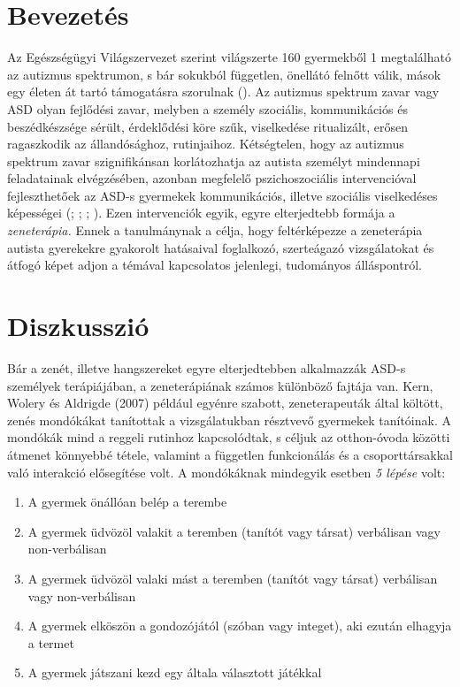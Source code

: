\section*{Bevezetés}

Az Egészségügyi Világszervezet szerint világ\-szerte 160 gyermekből 1 megtalálható az autizmus spektrumon, s bár sokukból független, önellátó felnőtt válik, mások egy életen át tartó támogatásra szorulnak (\cite{WHO}). Az autizmus spektrum zavar vagy ASD olyan fejlődési zavar, melyben a személy szociális, kommunikációs és beszédkészsége sérült, érdeklődési köre szűk, viselkedése ritualizált, erősen ragaszkodik az állandósághoz, rutinjaihoz. Kétségtelen, hogy az autizmus spektrum zavar szignifikánsan korlátozhatja az autista személyt mindennapi feladatainak elvégzésé\-ben, azonban megfelelő pszichoszociális intervencióval fejleszthetőek az ASD-s gyermekek kommunikációs, illetve szociális viselkedéses képességei (\textcite{boso_emanuele_minazzi_abbamonte_politi_2007}; \textcite{finnigan_starr_2010}; \textcite{kern_wolery_aldridge_2006}; \textcite{kim_wigram_gold_2009}). Ezen intervenciók egyik, egyre elterjedtebb formája a \textit{zeneterápia.} Ennek a tanulmánynak a célja, hogy feltérképezze a zeneterápia autista gyerekekre gyakorolt hatásaival foglalkozó, szerteágazó vizsgá\-latokat és átfogó képet adjon a témával kapcsolatos jelenlegi, tudományos álláspontról.
\pagebreak
\section*{Diszkusszió}

Bár a zenét, illetve hangszereket egyre elterjedtebben alkalmazzák ASD-s személyek terápiájában, a zeneterápiának számos különböző fajtája van. Kern, Wolery és Aldrigde (2007) például egyénre szabott, zeneterapeuták által költött, zenés mondóká\-kat tanítottak a vizsgálatukban résztvevő gyermekek tanítóinak. A mondókák mind a reggeli rutinhoz kapcsolódtak, s céljuk az otthon-óvoda közötti átmenet könnyebbé tétele, valamint a független funkcionálás és a csoporttársakkal való interakció elősegí\-tése volt. A mondó\-káknak mindegyik esetben \textit{5 lépése} volt:

\begin{enumerate}
	\item A gyermek önállóan belép a terembe
	
	\item A gyermek üdvözöl valakit a teremben (tanítót vagy társat) verbálisan vagy non-verbálisan
	
	\item A gyermek üdvözöl valaki mást a teremben (tanítót vagy társat) verbálisan vagy non-verbálisan
	
	\item A gyermek elköszön a gondozójától (szóban vagy integet), aki ezután elhagyja a termet
	
	\item A gyermek játszani kezd egy általa választott játékkal
\end{enumerate}

